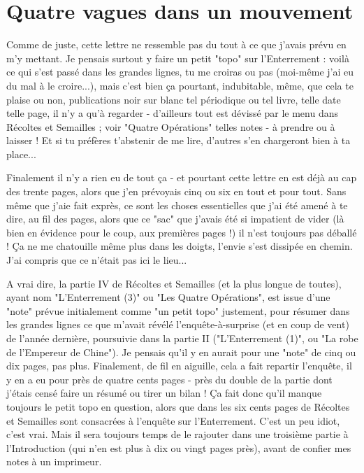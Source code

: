 \section{Quatre vagues dans un mouvement}

Comme de juste, cette lettre ne ressemble pas du tout à ce que j'avais prévu en m'y mettant. Je pensais surtout y faire un petit "topo" sur l'Enterrement : voilà ce qui s'est passé dans les grandes lignes, tu me croiras ou pas (moi-même j'ai eu du mal à le croire...), mais c'est bien ça pourtant, indubitable, même, que cela te plaise ou non, publications noir sur blanc tel périodique ou tel livre, telle date telle page, il n'y a qu'à regarder - d'ailleurs tout est dévissé par le menu dans Récoltes et Semailles ; voir "Quatre Opérations" telles notes - à prendre ou à laisser ! Et si tu préfères t'abstenir de me lire, d'autres s'en chargeront bien à ta place...

Finalement il n'y a rien eu de tout ça - et pourtant cette lettre en est déjà au cap des trente pages, alors que j'en prévoyais cinq ou six en tout et pour tout. Sans même que j’aie fait exprès, ce sont les choses essentielles que j'ai été amené à te dire, au fil des pages, alors que ce "sac" que j'avais été si impatient de vider (là bien en évidence pour le coup, aux premières pages !) il n'est toujours pas déballé ! Ça ne me chatouille même plus dans les doigts, l'envie s'est dissipée en chemin. J'ai compris que ce n'était pas ici le lieu...

A vrai dire, la partie IV de Récoltes et Semailles (et la plus longue de toutes), ayant nom "L'Enterrement (3)" ou "Les Quatre Opérations", est issue d'une "note" prévue initialement comme "un petit topo" justement, pour résumer dans les grandes lignes ce que m'avait révélé l'enquête-à-surprise (et en coup de vent) de l'année dernière, poursuivie dans la partie II ("L'Enterrement (1)", ou "La robe de l'Empereur de Chine"). Je pensais qu'il y en aurait pour une "note" de cinq ou dix pages, pas plus. Finalement, de fil en aiguille, cela a fait repartir l'enquête, il y en a eu pour près de quatre cents pages - près du double de la partie dont j'étais censé faire un résumé ou tirer un bilan ! Ça fait donc qu'il manque toujours le petit topo en question, alors que dans les six cents pages de Récoltes et Semailles sont consacrées à l'enquête sur l'Enterrement. C'est un peu idiot, c'est vrai. Mais il sera toujours temps de le rajouter dans une troisième partie à l'Introduction (qui n'en est plus à dix ou vingt pages près), avant de confier mes notes à un imprimeur.

